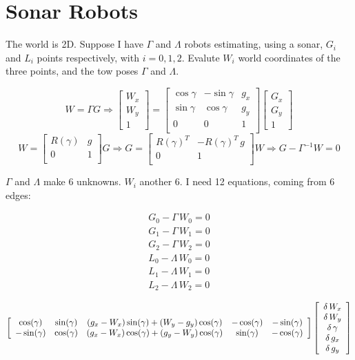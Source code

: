 \documentclass[a4paper]{article}
\newcommand{\cg}{\cos(\gamma)}
\newcommand{\sg}{\sin(\gamma)}
\begin{document}
\section*{Sonar Robots}
The world is 2D.
Suppose I have $\Gamma$ and $\Lambda$ robots estimating, using a sonar,
$G_i$ and $L_i$ points respectively, with $i = {0,1,2}$. Evalute $W_i$ world
coordinates of the three points, and the tow poses $\Gamma$ and $\Lambda$.

\[
W = \Gamma G \Rightarrow
\left[
\begin{array}{c}
W_x\\
W_y\\
1
\end{array}\right]
=
\left[
\begin{array}{ccc}
\cos{\gamma} & -\sin{\gamma} & g_x\\
\sin{\gamma} & \cos{\gamma} & g_y\\
0 & 0 & 1\\
\end{array}\right]
\left[
\begin{array}{c}
G_x\\
G_y\\
1
\end{array}\right]
\]
\[
W =
\left[
\begin{array}{cc}
R(\gamma) & g\\
0 & 1\\
\end{array}
\right] G
\Rightarrow
G =
\left[
\begin{array}{cc}
R(\gamma)^T & -R(\gamma)^T\,g\\
0 & 1\\
\end{array}
\right] W
\Rightarrow
G - \Gamma^{-1} W = 0
\]

$\Gamma$ and $\Lambda$ make 6 unknowns. $W_i$ another 6.
I need 12 equations, coming from 6 edges:

\begin{align}
G_0 - \Gamma\, W_0 = 0\nonumber\\
G_1 - \Gamma\, W_1 = 0\nonumber\\
G_2 - \Gamma\, W_2 = 0\nonumber\\
L_0 - \Lambda\, W_0 = 0\nonumber\\
L_1 - \Lambda\, W_1 = 0\nonumber\\
L_2 - \Lambda\, W_2 = 0\nonumber
\end{align}

\[
\left[
\begin{array}{c c c c c}
 \cg & \sg & (g_x-W_x)\sg+(W_y-g_y)\cg & -\cg & -\sg \\
-\sg & \cg & (g_x-W_x)\cg+(g_y-W_y)\cg & \sg & -\cg
\end{array}
\right]
\left[
\begin{array}{c}
\delta\, W_{x}\\ %
\delta\, W_{y}\\ %
\delta\, \gamma\\ %
\delta\, g_x\\    %
\delta\, g_y\\    %
\end{array}
\right]
\]
\end{document}
